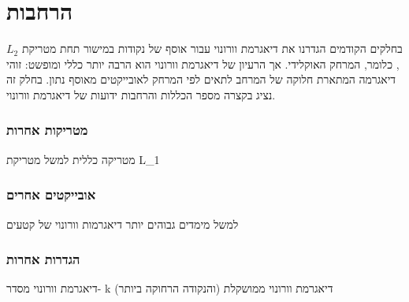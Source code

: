 \documentclass[
]{book}
\begin{document}
\hypertarget{ux5d4ux5e8ux5d7ux5d1ux5d5ux5ea}{%
\section{הרחבות}\label{ux5d4ux5e8ux5d7ux5d1ux5d5ux5ea}}

בחלקים הקודמים הגדרנו את דיאגרמת וורונוי עבור אוסף של נקודות במישור תחת מטריקת \(L_2\), כלומר, המרחק האוקלידי. אך הרעיון של דיאגרמת וורונוי הוא הרבה יותר כללי ומופשט: זוהי דיאגרמה המתארת חלוקה של המרחב לתאים לפי המרחק לאובייקטים מאוסף נתון. בחלק זה נציג בקצרה מספר הכללות והרחבות ידועות של דיאגרמת וורונוי.

\hypertarget{ux5deux5d8ux5e8ux5d9ux5e7ux5d5ux5ea-ux5d0ux5d7ux5e8ux5d5ux5ea}{%
\subsubsection{מטריקות אחרות}\label{ux5deux5d8ux5e8ux5d9ux5e7ux5d5ux5ea-ux5d0ux5d7ux5e8ux5d5ux5ea}}

מטריקה כללית
למשל מטריקת L\_1

\hypertarget{ux5d0ux5d5ux5d1ux5d9ux5d9ux5e7ux5d8ux5d9ux5dd-ux5d0ux5d7ux5e8ux5d9ux5dd}{%
\subsubsection{אובייקטים אחרים}\label{ux5d0ux5d5ux5d1ux5d9ux5d9ux5e7ux5d8ux5d9ux5dd-ux5d0ux5d7ux5e8ux5d9ux5dd}}

למשל מימדים גבוהים יותר
דיאגרמות וורונוי של קטעים

\hypertarget{ux5d4ux5d2ux5d3ux5e8ux5d5ux5ea-ux5d0ux5d7ux5e8ux5d5ux5ea}{%
\subsubsection{הגדרות אחרות}\label{ux5d4ux5d2ux5d3ux5e8ux5d5ux5ea-ux5d0ux5d7ux5e8ux5d5ux5ea}}

דיאגרמת וורונוי מסדר- k (והנקודה הרחוקה ביותר)
דיאגרמת וורונוי ממושקלת

  
\end{document}

